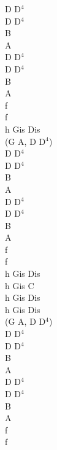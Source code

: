 \documentclass[a5paper, 10pt]{book}
\begin{document}
\begin{minipage}[t]{0.15\textwidth}
  D D$^4$\\
  D D$^4$\\
  B\\
  A\\
  D D$^4$\\
  D D$^4$\\
  B\\
  A\\
  f\\
  f\\

  h Gis Dis\\
  (G A, D D$^4$)\\
  D D$^4$\\
  D D$^4$\\
  B\\
  A\\
  D D$^4$\\
  D D$^4$\\
  B\\
  A\\
  f\\
  f\\

  h Gis Dis\\
  h Gis C\\
  h Gis Dis\\
  h Gis Dis\\
  (G A, D D$^4$)\\
  D D$^4$\\
  D D$^4$\\
  B\\
  A\\
  D D$^4$\\
  D D$^4$\\
  B\\
  A\\
  f\\
  f\\

\end{minipage}
\newpage
\end{document}
